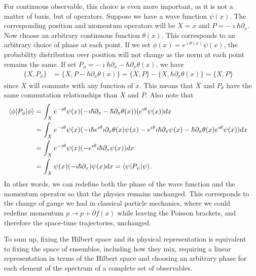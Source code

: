 For continuous observable, this choice is even more important, as it is not a matter of basis, but of operators. Suppose we have a wave function $\psi(x)$. The corresponding position and momentum operators will be $X=x$ and $P=-\imath \hbar \partial_x$. Now choose an arbitrary continuous function $\theta(x)$. This corresponds to an arbitrary choice of phase at each point. If we set $\phi(x) = e^{\imath \theta(x)} \psi(x)$, the probability distribution over position will not change as the norm at each point remains the same. If set $P_{\phi} = -\imath \hbar \partial_x - \hbar \partial_x \theta(x)$, we have
\begin{equation}
	\begin{aligned}
		\{X, P_{\phi}\} &= \{X, P - \hbar \partial_x \theta(x)\} = \{X, P \} - \{X, \hbar \partial_x \theta(x)\} = \{X, P \}
	\end{aligned}
\end{equation}
since $X$ will commute with any function of $x$. This means that $X$ and $P_{\theta}$ have the same commutation relationships than $X$ and $P$. Also note that
\begin{equation}
	\begin{aligned}
		\langle\phi | P_{\phi} | \phi \rangle & = \int_X e^{ - \imath \theta} \psi(x) (-\imath \hbar \partial_x - \hbar \partial_x  \theta(x) )(e^{ \imath \theta} \psi(x)) dx \\
		& = \int_X e^{ - \imath \theta} \psi(x) (-\imath \hbar e^{ \imath \theta} \imath \partial_x \theta(x)  \psi(x) - e^{ \imath \theta} \imath \hbar \partial_x\psi(x)  - \hbar \partial_x  \theta(x) e^{ \imath \theta} \psi(x)) dx \\
		& = \int_X e^{ - \imath \theta} \psi(x) (- e^{ \imath \theta} \imath \hbar \partial_x\psi(x) ) dx \\
		& = \int_X \psi(x) (- \imath \hbar \partial_x )\psi(x)  dx  = \langle\psi | P_{\psi} | \psi \rangle.
	\end{aligned}
\end{equation}
In other words, we can redefine both the phase of the wave function and the momentum operator so that the physics remains unchanged. This corresponds to the change of gauge we had in classical particle mechanics, where we could redefine momentum $p \to p + \partial f(x)$ while leaving the Poisson brackets, and therefore the space-time trajectories, unchanged.

To sum up, fixing the Hilbert space and its physical representation is equivalent to fixing the space of ensembles, including how they mix, requiring a linear representation in terms of the Hilbert space and choosing an arbitrary phase for each element of the spectrum of a complete set of observables.

